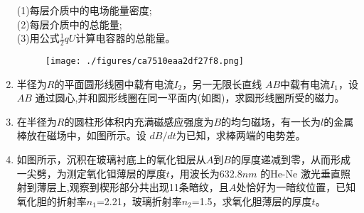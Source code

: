 \begin{enumerate}
(1)每层介质中的电场能量密度;\\
(2)每层介质中的总能量;\\
(3)用公式$\frac{1}{2}qU$计算电容器的总能量。
\begin{figure}[ht]
\centering
\texttt{[image: ./figures/ca7510eaa2df27f8.png]}
\caption{} \label{fig_SD05_5}
\end{figure}
\item 半径为$R$的平面圆形线圈中载有电流$I_2$，另一无限长直线 $AB $中载有电流$I_1$，设 $AB$ 通过圆心,并和圆形线圈在同一平面内(如图)，求圆形线圈所受的磁力。
\item 在半径为$R$的圆柱形体积内充满磁感应强度为$B$的均匀磁场，有一长为$l$的金属棒放在磁场中，如图所示。设 $dB/dt $为已知，求棒两端的电势差。
\item 如图所示，沉积在玻璃衬底上的氧化钽层从$A$到$B$的厚度递减到零，从而形成一尖劈，为测定氧化钽薄层的厚度$t$，用波长为$632.8nm$ 的He-Ne 激光垂直照射到薄层上,观察到楔形部分共出现11条暗纹，且$A$处恰好为一暗纹位置，已知氧化胆的折射率$n_1$=2.21，玻璃折射率$n_2$=1.5，求氧化胆薄层的厚度$t$。
\end{enumerate}